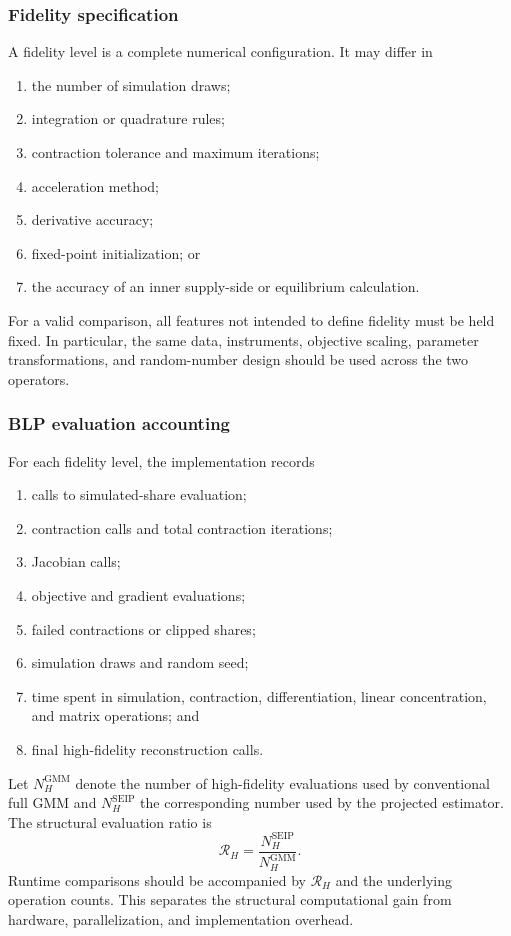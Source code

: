 \subsubsection{Fidelity specification}

A fidelity level is a complete numerical configuration. It may differ in
\begin{enumerate}
 \item the number of simulation draws;
 \item integration or quadrature rules;
 \item contraction tolerance and maximum iterations;
 \item acceleration method;
 \item derivative accuracy;
 \item fixed-point initialization; or
 \item the accuracy of an inner supply-side or equilibrium calculation.
\end{enumerate}
For a valid comparison, all features not intended to define fidelity must be
held fixed. In particular, the same data, instruments, objective scaling,
parameter transformations, and random-number design should be used across the
two operators.

\subsubsection{BLP evaluation accounting}

For each fidelity level, the implementation records
\begin{enumerate}
 \item calls to simulated-share evaluation;
 \item contraction calls and total contraction iterations;
 \item Jacobian calls;
 \item objective and gradient evaluations;
 \item failed contractions or clipped shares;
 \item simulation draws and random seed;
 \item time spent in simulation, contraction, differentiation, linear
 concentration, and matrix operations; and
 \item final high-fidelity reconstruction calls.
\end{enumerate}
Let $N_H^{\mathrm{GMM}}$ denote the number of high-fidelity evaluations used by
conventional full GMM and $N_H^{\mathrm{SEIP}}$ the corresponding number used by
the projected estimator. The structural evaluation ratio is
\begin{equation}
 \mathcal R_H
 =
 \frac{N_H^{\mathrm{SEIP}}}
 {N_H^{\mathrm{GMM}}}.
 \label{eq:app_blp_evaluation_ratio}
\end{equation}
Runtime comparisons should be accompanied by $\mathcal R_H$ and the underlying
operation counts. This separates the structural computational gain from
hardware, parallelization, and implementation overhead.

